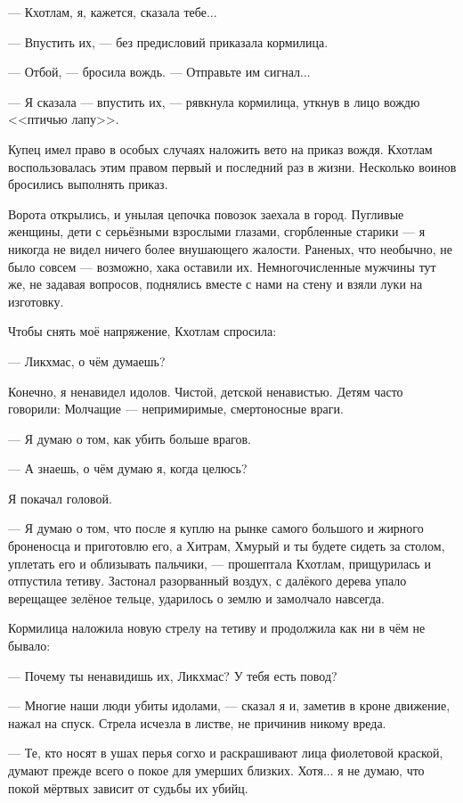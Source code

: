 --- Кхотлам, я, кажется, сказала тебе...

--- Впустить их, --- без предисловий приказала кормилица.

--- Отбой, --- бросила вождь.
--- Отправьте им сигнал...

--- Я сказала --- впустить их, --- рявкнула кормилица, уткнув в лицо вождю <<птичью лапу>>.

Купец имел право в особых случаях наложить вето на приказ вождя.
Кхотлам воспользовалась этим правом первый и последний раз в жизни.
Несколько воинов бросились выполнять приказ.

Ворота открылись, и унылая цепочка повозок заехала в город.
Пугливые женщины, дети с серьёзными взрослыми глазами, сгорбленные старики --- я никогда не видел ничего более внушающего жалости.
Раненых, что необычно, не было совсем --- возможно, хака оставили их.
Немногочисленные мужчины тут же, не задавая вопросов, поднялись вместе с нами на стену и взяли луки на изготовку.

Чтобы снять моё напряжение, Кхотлам спросила:

--- Ликхмас, о чём думаешь?

Конечно, я ненавидел идолов.
Чистой, детской ненавистью.
Детям часто говорили: Молчащие --- непримиримые, смертоносные враги.

--- Я думаю о том, как убить больше врагов.

--- А знаешь, о чём думаю я, когда целюсь?

Я покачал головой.

--- Я думаю о том, что после я куплю на рынке самого большого и жирного броненосца и приготовлю его, а Хитрам, Хмурый и ты будете сидеть за столом, уплетать его и облизывать пальчики, --- прошептала Кхотлам, прищурилась и отпустила тетиву.
Застонал разорванный воздух, с далёкого дерева упало верещащее зелёное тельце, ударилось о землю и замолчало навсегда.

Кормилица наложила новую стрелу на тетиву и продолжила как ни в чём не бывало:

--- Почему ты ненавидишь их, Ликхмас?
У тебя есть повод?

--- Многие наши люди убиты идолами, --- сказал я и, заметив в кроне движение, нажал на спуск.
Стрела исчезла в листве, не причинив никому вреда.

--- Те, кто носят в ушах перья согхо и раскрашивают лица фиолетовой краской, думают прежде всего о покое для умерших близких.
Хотя... я не думаю, что покой мёртвых зависит от судьбы их убийц.

